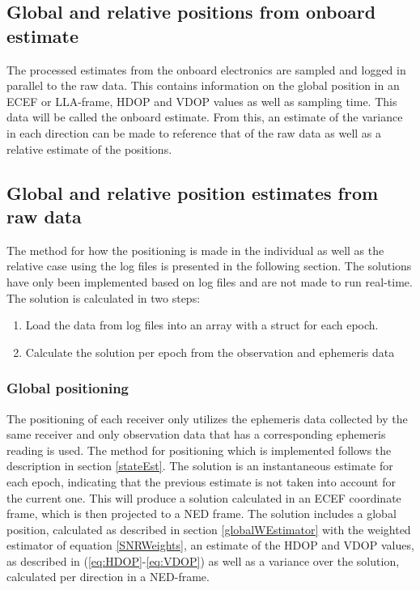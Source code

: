 \subsection{Global and relative positions from onboard estimate}
The processed estimates from the onboard electronics are sampled and logged in parallel to the raw data. This contains information on the global position in an ECEF or LLA-frame, HDOP and VDOP values as well as sampling time. This data will be called the onboard estimate. From this, an estimate of the variance in each direction can be made to reference that of the raw data as well as a relative estimate of the positions.
\subsection{Global and relative position estimates from raw data}
The method for how the positioning is made in the individual as well as the relative case using the log files is presented in the following section. The solutions have only been implemented based on log files and are not made to run real-time.
The solution is calculated in two steps: 
\begin{enumerate}
\item Load the data from log files into an array with a struct for each epoch. 
\item Calculate the solution per epoch from the observation and ephemeris data
\end{enumerate} 
\subsubsection{Global positioning}
The positioning of each receiver only utilizes the ephemeris data collected by the same receiver and only observation data that has a corresponding ephemeris reading is used. The method for positioning which is implemented follows the description in section \ref{stateEst}. The solution is an instantaneous estimate for each epoch, indicating that the previous estimate is not taken into account for the current one. This will produce a solution calculated in an ECEF coordinate frame, which is then projected to a NED frame. The solution includes a global position, calculated as described in section \ref{globalWEstimator} with the weighted estimator of equation \ref{SNRWeights}, an estimate of the HDOP and VDOP values, as described in (\ref{eq:HDOP}-\ref{eq:VDOP}) as well as a variance over the solution, calculated per direction in a NED-frame.

